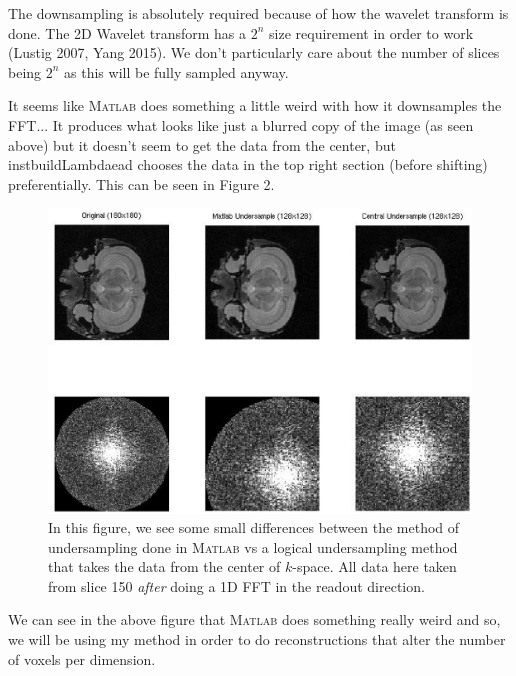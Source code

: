 \documentclass[11 pt]{article}
\newcommand{\matlab}{\textsc{Matlab }}
\begin{document}
  The downsampling is absolutely required because of how the wavelet transform is done. The 2D Wavelet transform has a $2^n$ size requirement in order to work (Lustig 2007, Yang 2015). We don't particularly care about the number of slices being $2^n$ as this will be fully sampled anyway. 

  It seems like \matlab does something a little weird with how it downsamples the FFT... It produces what looks like just a blurred copy of the image (as seen above) but it doesn't seem to get the data from the center, but instbuildLambdaead chooses the data in the top right section (before shifting) preferentially. This can be seen in Figure 2.

  \newpage
  \begin{figure}[h] 

    \centering
    \vspace{0pt}
    \setlength\fboxsep{0pt}
    \setlength\fboxrule{0.5pt}
    \includegraphics[trim = {36mm 20mm 20mm 8mm},clip,scale = 0.6] {Figs/CS_DTI_Sims/FullvsMatvsCent.eps}
    \caption{In this figure, we see some small differences between the method of undersampling done in \matlab vs a logical undersampling method that takes the data from the center of $k$-space. All data here taken from slice 150 \emph{after} doing a 1D FFT in the readout direction.}
    \label{fig:matvscent}

  \end{figure}

  We can see in the above figure that \matlab does something really weird and so, we will be using my method in order to do reconstructions that alter the number of voxels per dimension.
\end{document}
